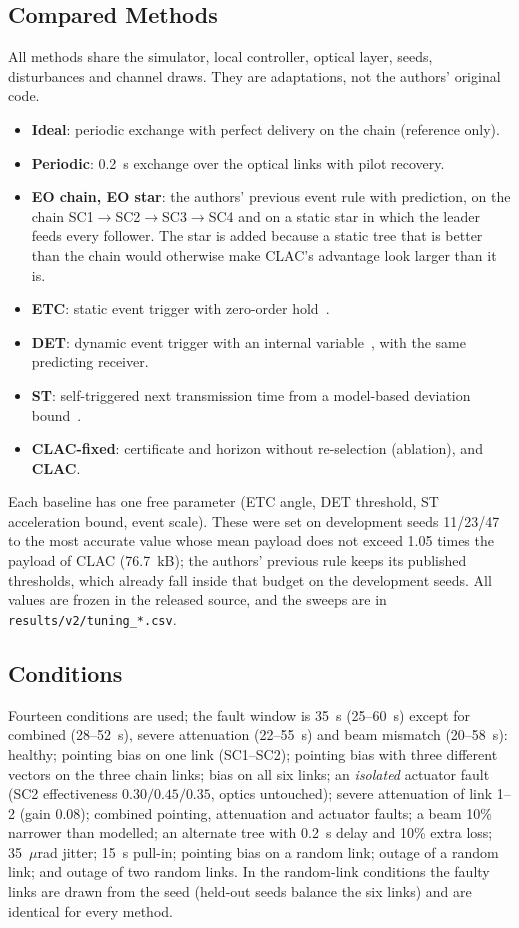 \documentclass[journal]{IEEEtran}
\begin{document}
\subsection{Compared Methods}
All methods share the simulator, local controller, optical layer, seeds, disturbances and channel draws. They are adaptations, not the authors' original code.
\begin{itemize}
\item \textbf{Ideal}: periodic exchange with perfect delivery on the chain (reference only).
\item \textbf{Periodic}: 0.2~s exchange over the optical links with pilot recovery.
\item \textbf{EO chain, EO star}: the authors' previous event rule with prediction, on the chain SC1$\to$SC2$\to$SC3$\to$SC4 and on a static star in which the leader feeds every follower. The star is added because a static tree that is better than the chain would otherwise make CLAC's advantage look larger than it is.
\item \textbf{ETC}: static event trigger with zero-order hold~\cite{tabuada2007}.
\item \textbf{DET}: dynamic event trigger with an internal variable~\cite{girard2015}, with the same predicting receiver.
\item \textbf{ST}: self-triggered next transmission time from a model-based deviation bound~\cite{mazo2010,heemels2012}.
\item \textbf{CLAC-fixed}: certificate and horizon without re-selection (ablation), and \textbf{CLAC}.
\end{itemize}
Each baseline has one free parameter (ETC angle, DET threshold, ST acceleration bound, event scale). These were set on development seeds 11/23/47 to the most accurate value whose mean payload does not exceed 1.05 times the payload of CLAC (76.7~kB); the authors' previous rule keeps its published thresholds, which already fall inside that budget on the development seeds. All values are frozen in the released source, and the sweeps are in \texttt{results/v2/tuning\_*.csv}.

\subsection{Conditions}
Fourteen conditions are used; the fault window is 35~s (25--60~s) except for combined (28--52~s), severe attenuation (22--55~s) and beam mismatch (20--58~s): healthy; pointing bias on one link (SC1--SC2); pointing bias with three different vectors on the three chain links; bias on all six links; an \emph{isolated} actuator fault (SC2 effectiveness $0.30/0.45/0.35$, optics untouched); severe attenuation of link 1--2 (gain 0.08); combined pointing, attenuation and actuator faults; a beam 10\% narrower than modelled; an alternate tree with 0.2~s delay and 10\% extra loss; 35~$\mu$rad jitter; 15~s pull-in; pointing bias on a random link; outage of a random link; and outage of two random links. In the random-link conditions the faulty links are drawn from the seed (held-out seeds balance the six links) and are identical for every method.
\end{document}
